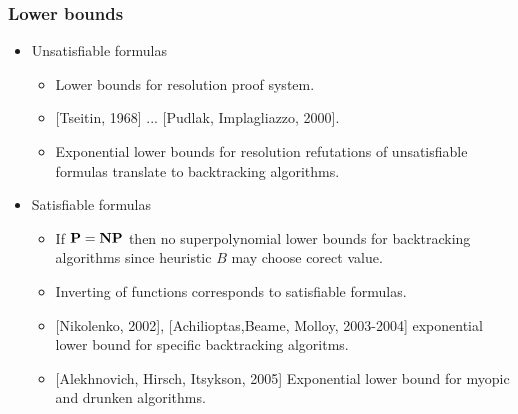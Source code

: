 \begin{frame}
    \frametitle{Lower bounds}

    \pause
	\begin{itemize}
		\item Unsatisfiable formulas
		\begin{itemize}
			\item Lower bounds for resolution proof system.
			\item{} [Tseitin, 1968] ... [Pudlak, Implagliazzo, 2000].
			\item{} Exponential lower bounds for resolution refutations
				of unsatisfiable formulas translate to backtracking
                algorithms.
		\end{itemize}
        \pause
		\item Satisfiable formulas
		\begin{itemize}
			\item If $\bf P = NP$ then no superpolynomial lower bounds
		        for backtracking algorithms since heuristic $B$ may
                choose corect value.
            \pause
			\item Inverting of functions corresponds to satisfiable
		        formulas.
            \pause
            \item{} [Nikolenko, 2002], [Achilioptas,Beame, Molloy, 2003-2004]
				exponential lower bound for specific backtracking
                algoritms.
            \item{} [Alekhnovich, Hirsch, Itsykson, 2005] Exponential lower bound 
				for myopic and drunken algorithms.
		\end{itemize}
	\end{itemize}
\end{frame}

